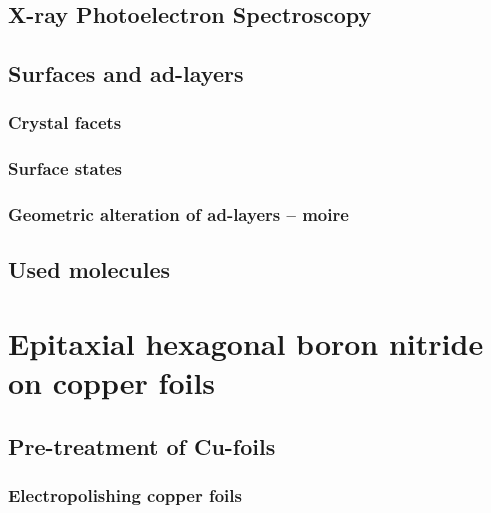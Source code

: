 \documentclass[10pt,a4paper,twoside
,BCOR=8mm				%
,headings=normal		%
,headsepline			%
,footsepline			%
,plainfootsepline		%
]{scrbook}
\begin{document}
  \section{\textbf{X}-ray \textbf{P}hotoelectron \textbf{S}pectroscopy}
	
  \section{Surfaces and ad-layers}
     \subsection{Crystal facets}
        
     \subsection{Surface states}
		
     \subsection{Geometric alteration of ad-layers -- moire}
		
  \section{Used molecules}
    
\chapter{Epitaxial hexagonal boron nitride on copper foils}
  
\section{Pre-treatment of Cu-foils}
  \subsection{Electropolishing copper foils}
  
%      
%      
\end{document}
